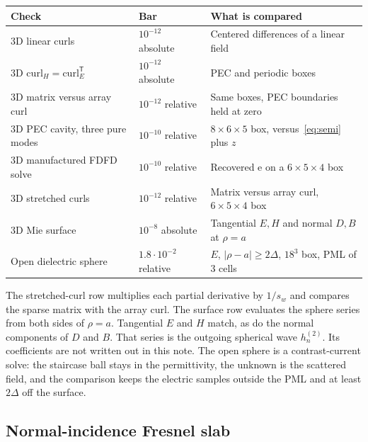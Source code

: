 \documentclass[11pt,a4paper]{article}
\numberwithin{equation}{section}
\begin{document}
\begin{center}
\small
\begin{tabular}{@{}>{\raggedright\arraybackslash}p{5.0cm}>{\raggedright\arraybackslash}p{3.5cm}>{\raggedright\arraybackslash}p{6.2cm}@{}}
\toprule
Check & Bar & What is compared\\
\midrule
3D linear curls & $10^{-12}$ absolute & Centered differences of a linear field\\
3D $\mathrm{curl}_H=\mathrm{curl}_E^{\mathsf T}$ & $10^{-12}$ absolute & PEC and periodic boxes\\
3D matrix versus array curl & $10^{-12}$ relative & Same boxes, PEC boundaries held at zero\\
3D PEC cavity, three pure modes & $10^{-10}$ relative & $8\times 6\times 5$ box, versus~\eqref{eq:semi} plus $z$\\
3D manufactured FDFD solve & $10^{-10}$ relative & Recovered $\mathrm{e}$ on a $6\times 5\times 4$ box\\
3D stretched curls & $10^{-12}$ relative & Matrix versus array curl, $6\times 5\times 4$ box\\
3D Mie surface & $10^{-8}$ absolute & Tangential $E,H$ and normal $D,B$ at $\rho=a$\\
Open dielectric sphere & $1.8\cdot 10^{-2}$ relative & $E$, $|\rho-a|\ge 2\Delta$, $18^3$ box, PML of 3 cells\\
\bottomrule
\end{tabular}
\end{center}

The stretched-curl row multiplies each partial derivative by $1/s_w$ and
compares the sparse matrix with the array curl. The surface row evaluates
the sphere series from both sides of $\rho=a$. Tangential $E$ and $H$
match, as do the normal components of $D$ and $B$. That series is the
outgoing spherical wave $h_n^{(2)}$. Its coefficients are not written out
in this note. The open sphere is a contrast-current solve: the staircase
ball stays in the permittivity, the unknown is the scattered field, and
the comparison keeps the electric samples outside the PML and at least
$2\Delta$ off the surface.

\subsection{Normal-incidence Fresnel slab}
\label{sec:fresnel}
\end{document}
